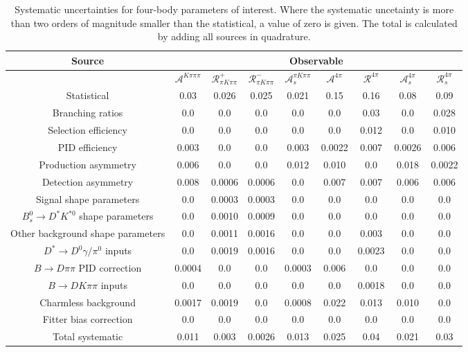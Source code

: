 \begin{sidewaystable}
  \centering
  \begin{tabular}{ccccccccc}
      \toprule
      Source & \multicolumn{8}{c}{Observable} \\
      \midrule
       & $\mathcal{A}^{K\pi\pi\pi}$ & $\mathcal{R}_{\pi K\pi\pi}^+$ & $\mathcal{R}_{\pi K\pi\pi}^-$ & $\mathcal{A}_s^{\pi K\pi\pi}$ & $\mathcal{A}^{4\pi}$ & $\mathcal{R}^{4\pi}$ & $\mathcal{A}_s^{4\pi}$ & $\mathcal{R}_{s}^{4\pi}$ \\
      \midrule
      Statistical & 0.03 & 0.026 & 0.025 & 0.021 & 0.15 & 0.16 & 0.08 & 0.09 \\
      \midrule
      Branching ratios & 0.0  & 0.0  & 0.0  & 0.0  & 0.0  & 0.03 & 0.0  & 0.028 \\
      Selection efficiency & 0.0  & 0.0  & 0.0  & 0.0  & 0.0  & 0.012 & 0.0  & 0.010 \\
      PID efficiency & 0.003 & 0.0  & 0.0  & 0.003 & 0.0022 & 0.007 & 0.0026 & 0.006 \\
      Production asymmetry & 0.006 & 0.0  & 0.0  & 0.012 & 0.010 & 0.0  & 0.018 & 0.0022 \\
      Detection asymmetry & 0.008 & 0.0006 & 0.0006 & 0.0  & 0.007 & 0.007 & 0.006 & 0.006 \\
      Signal shape parameters & 0.0  & 0.0003 & 0.0003 & 0.0  & 0.0  & 0.0  & 0.0  & 0.0  \\
      $B^0_s \to D^* K^{*0}$ shape parameters & 0.0  & 0.0010 & 0.0009 & 0.0  & 0.0  & 0.0  & 0.0  & 0.0  \\
      Other background shape parameters & 0.0  & 0.0011 & 0.0016 & 0.0  & 0.0  & 0.003 & 0.0  & 0.0  \\
      $D^* \to D^0 \gamma/\pi^0$ inputs & 0.0  & 0.0019 & 0.0016 & 0.0  & 0.0  & 0.0023 & 0.0  & 0.0  \\
      $B\to D\pi\pi$ PID correction & 0.0004 & 0.0  & 0.0  & 0.0003 & 0.006 & 0.0  & 0.0  & 0.0  \\
      $B\to DK\pi\pi$ inputs & 0.0  & 0.0  & 0.0  & 0.0  & 0.0  & 0.0018 & 0.0  & 0.0  \\
      Charmless background & 0.0017 & 0.0019 & 0.0  & 0.0008 & 0.022 & 0.013 & 0.010 & 0.0  \\
      Fitter bias correction & 0.0  & 0.0  & 0.0  & 0.0  & 0.0  & 0.0  & 0.0  & 0.0  \\
      \midrule
      Total systematic & 0.011 & 0.003 & 0.0026 & 0.013 & 0.025 & 0.04 & 0.021 & 0.03 \\
      \bottomrule
  \end{tabular}
  \caption{Systematic uncertainties for four-body parameters of interest. Where the systematic uncetainty is more than two orders of magnitude smaller than the statistical, a value of zero is given. The total is calculated by adding all sources in quadrature.}
\label{tab:fourBody_systematics}
\end{sidewaystable}
